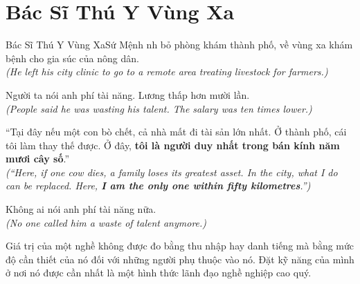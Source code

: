 \section{Bác Sĩ Thú Y Vùng Xa}
\begin{truyen}{Bác Sĩ Thú Y Vùng Xa}{Sứ Mệnh}
nh bỏ phòng khám thành phố, về vùng xa khám bệnh cho gia súc của nông dân.\\
\textit{(He left his city clinic to go to a remote area treating livestock for farmers.)}

Người ta nói anh phí tài năng. Lương thấp hơn mười lần.\\
\textit{(People said he was wasting his talent. The salary was ten times lower.)}

``Tại đây nếu một con bò chết, cả nhà mất đi tài sản lớn nhất. Ở thành phố, cái tôi làm thay thế được. Ở đây, \textbf{tôi là người duy nhất trong bán kính năm mươi cây số}.''\\
\textit{(``Here, if one cow dies, a family loses its greatest asset. In the city, what I do can be replaced. Here, \textbf{I am the only one within fifty kilometres}.'')}

Không ai nói anh phí tài năng nữa.\\
\textit{(No one called him a waste of talent anymore.)}
\end{truyen}
\begin{baihoc}
  Giá trị của một nghề không được đo bằng thu nhập hay danh tiếng mà bằng mức độ cần thiết của nó đối với những người phụ thuộc vào nó. Đặt kỹ năng của mình ở nơi nó được cần nhất là một hình thức lãnh đạo nghề nghiệp cao quý.
\end{baihoc}

